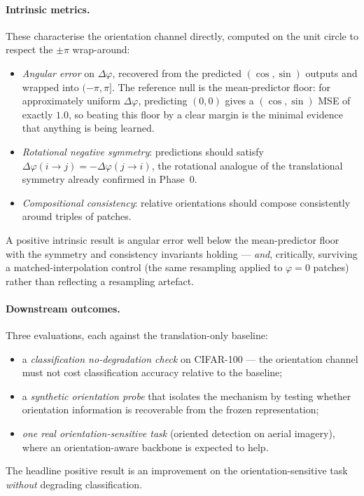 \documentclass[11pt,a4paper]{report}
\begin{document}
\paragraph{Intrinsic metrics.} These characterise the orientation channel directly,
computed on the unit circle to respect the $\pm\pi$ wrap-around:
\begin{itemize}
  \item \emph{Angular error} on $\Delta\varphi$, recovered from the predicted
  $(\cos,\sin)$ outputs and wrapped into $(-\pi,\pi]$. The reference null is the
  mean-predictor floor: for approximately uniform $\Delta\varphi$, predicting
  $(0,0)$ gives a $(\cos,\sin)$ MSE of exactly $1.0$, so beating this floor by a
  clear margin is the minimal evidence that anything is being learned.
  \item \emph{Rotational negative symmetry}: predictions should satisfy
  $\Delta\varphi(i\!\to\!j) = -\Delta\varphi(j\!\to\!i)$, the rotational analogue of
  the translational symmetry already confirmed in Phase~0.
  \item \emph{Compositional consistency}: relative orientations should compose
  consistently around triples of patches.
\end{itemize}
A positive intrinsic result is angular error well below the mean-predictor floor with
the symmetry and consistency invariants holding --- \emph{and}, critically, surviving
a matched-interpolation control (the same resampling applied to $\varphi = 0$
patches) rather than reflecting a resampling artefact.

\paragraph{Downstream outcomes.} Three evaluations, each against the
translation-only baseline:
\begin{itemize}
  \item a \emph{classification no-degradation check} on CIFAR-100 --- the orientation
  channel must not cost classification accuracy relative to the baseline;
  \item a \emph{synthetic orientation probe} that isolates the mechanism by testing
  whether orientation information is recoverable from the frozen representation;
  \item \emph{one real orientation-sensitive task} (oriented detection on aerial
  imagery), where an orientation-aware backbone is expected to help.
\end{itemize}
The headline positive result is an improvement on the orientation-sensitive task
\emph{without} degrading classification.
\end{document}
